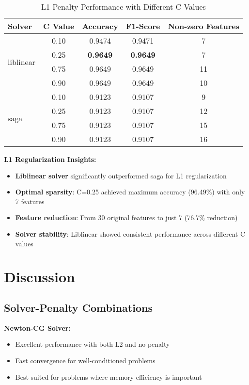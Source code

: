 \documentclass[12pt,a4paper]{article}
\begin{document}
\begin{table}[H]
\centering
\caption{L1 Penalty Performance with Different C Values}
\begin{tabular}{|l|c|c|c|c|}
\hline
\textbf{Solver} & \textbf{C Value} & \textbf{Accuracy} & \textbf{F1-Score} & \textbf{Non-zero Features} \\
\hline
\multirow{4}{*}{liblinear} & 0.10 & 0.9474 & 0.9471 & 7 \\
& 0.25 & \textbf{0.9649} & \textbf{0.9649} & 7 \\
& 0.75 & 0.9649 & 0.9649 & 11 \\
& 0.90 & 0.9649 & 0.9649 & 10 \\
\hline
\multirow{4}{*}{saga} & 0.10 & 0.9123 & 0.9107 & 9 \\
& 0.25 & 0.9123 & 0.9107 & 12 \\
& 0.75 & 0.9123 & 0.9107 & 15 \\
& 0.90 & 0.9123 & 0.9107 & 16 \\
\hline
\end{tabular}
\end{table}

\textbf{L1 Regularization Insights:}
\begin{itemize}
    \item \textbf{Liblinear solver} significantly outperformed saga for L1 regularization
    \item \textbf{Optimal sparsity}: C=0.25 achieved maximum accuracy (96.49\%) with only 7 features
    \item \textbf{Feature reduction}: From 30 original features to just 7 (76.7\% reduction)
    \item \textbf{Solver stability}: Liblinear showed consistent performance across different C values
\end{itemize}

\section{Discussion}

\subsection{Solver-Penalty Combinations}

\textbf{Newton-CG Solver:}
\begin{itemize}
    \item Excellent performance with both L2 and no penalty
    \item Fast convergence for well-conditioned problems
    \item Best suited for problems where memory efficiency is important
\end{itemize}
\end{document}
